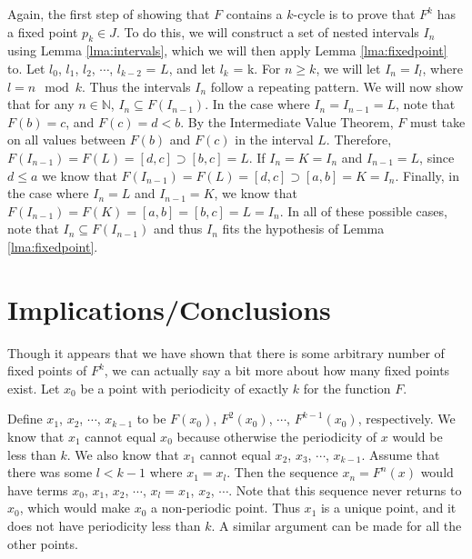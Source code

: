 \documentclass[12pt]{IEEEtran}
\begin{document}

Again, the first step of showing that $F$ contains a $k$-cycle is to prove that $F^k$ has a fixed point $p_k \in J$. To do this, we will construct a set of nested intervals $I_n$  using Lemma \ref{lma:intervals}, which we will then apply Lemma \ref{lma:fixedpoint} to. Let $l_0$, $l_1$, $l_2$, $\cdots$, $l_{k-2}$ = $L$, and let $l_k$ = k. For $n \geq k$, we will let $I_n = I_l$, where $l = n \mod k$. Thus the intervals $I_n$ follow a repeating pattern. We will now show that for any $n \in \mathbb{N}$, $I_n \subseteq F \left( I_{n-1} \right)$. In the case where $I_n = I_{n-1} = L$, note that $F \left( b \right) = c$, and $F \left( c \right) = d < b$. By the Intermediate Value Theorem, $F$ must take on all values between $F \left( b \right)$ and $F \left( c \right)$ in the interval $L$. Therefore, $F \left( I_{n-1} \right) = F \left( L \right) = [d, c] \supset \left[ b,c \right] = L$. If $I_n = K = I_n$ and $I_{n-1} = L$, since $d \leq a$ we know that $F \left( I_{n-1} \right) = F \left( L \right) = [d, c] \supset \left[ a,b \right] = K = I_n$. Finally, in the case where $I_n = L$ and $I_{n-1} = K$, we know that $F \left( I_{n-1} \right) = F \left( K \right) = [a, b] = \left[ b,c \right] = L = I_n$. In all of these possible cases, note that $I_n \subseteq F \left( I_{n-1} \right)$ and thus $I_n$ fits the hypothesis of Lemma \ref{lma:fixedpoint}.


\section{Implications/Conclusions}

Though it appears that we have shown that there is some arbitrary number of fixed points of $F^k$, we can actually say a bit more about how many fixed points exist. Let $x_0$ be a point with periodicity of exactly $k$ for the function $F$.

Define $x_1$, $x_2$, $\cdots$, $x_{k-1}$ to be $F \left( x_0 \right)$, $F^2 \left( x_0 \right)$, $\cdots$, $F^{k-1} \left( x_0 \right)$, respectively. We know that $x_1$ cannot equal $x_0$ because otherwise the periodicity of $x$ would be less than $k$. We also know that $x_1$  cannot equal $x_2$, $x_3$, $\cdots$, $x_{k-1}$. Assume that there was some $l < k-1$ where $x_1 = x_l$. Then the sequence $x_n = F^n \left( x \right)$ would have terms $x_0$, $x_1$, $x_2$, $\cdots$, $x_l = x_1$, $x_2$, $\cdots$. Note that this sequence never returns to $x_0$, which would make $x_0$ a non-periodic point. Thus $x_1$ is a unique point, and it does not have periodicity less than $k$. A similar argument can be made for all the other points.
\end{document}

